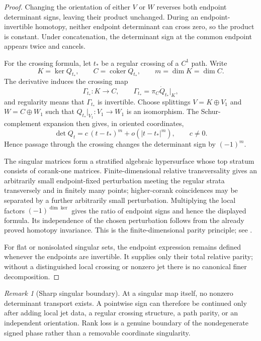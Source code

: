 \documentclass[11pt]{article}
\theoremstyle{definition}
\theoremstyle{remark}
\newtheorem{remark}[theorem]{Remark}
\begin{document}
\begin{proof}
Changing the orientation of either \(V\) or \(W\) reverses both endpoint
determinant signs, leaving their product unchanged.  During an
endpoint-invertible homotopy, neither endpoint determinant can cross zero, so
the product is constant.  Under concatenation, the determinant sign at the
common endpoint appears twice and cancels.

For the crossing formula, let \(t_*\) be a regular crossing of a \(C^1\)
path.  Write
\[
 K=\ker Q_{t_*},\qquad C=\operatorname{coker}Q_{t_*},
 \qquad m=\dim K=\dim C.
\]
The derivative induces the crossing map
\[
 \Gamma_{t_*}:K\longrightarrow C,\qquad
 \Gamma_{t_*}=\pi_C\dot Q_{t_*}|_K,
\]
and regularity means that \(\Gamma_{t_*}\) is invertible.  Choose splittings
\(V=K\oplus V_1\) and \(W=C\oplus W_1\) such that
\(Q_{t_*}|_{V_1}:V_1\to W_1\) is an isomorphism.  The Schur-complement
expansion then gives, in oriented coordinates,
\[
 \det Q_t
 =
 c\,(t-t_*)^m+o(|t-t_*|^m),
 \qquad c\ne0.
\]
Hence passage through the crossing changes the determinant sign by
\((-1)^m\).

The singular matrices form a stratified algebraic hypersurface whose
top stratum consists of corank-one matrices.  Finite-dimensional relative
transversality gives an arbitrarily small endpoint-fixed perturbation meeting
the regular strata transversely and in finitely many points; higher-corank
coincidences may be separated by a further arbitrarily small perturbation.
Multiplying the local factors \((-1)^{\dim\ker}\) gives the ratio of endpoint
signs and hence the displayed formula.  Its independence of the chosen
perturbation follows from the already proved homotopy invariance.  This is the
finite-dimensional parity principle; see
\cite{FitzpatrickPejsachowicz1991,DollSchulzBaldesWaterstraat2019}.

For flat or nonisolated singular sets, the endpoint expression remains
defined whenever the endpoints are invertible.  It supplies only their total
relative parity; without a distinguished local crossing or nonzero jet there
is no canonical finer decomposition.
\end{proof}

\begin{remark}[Sharp singular boundary]
At a singular map itself, no nonzero determinant transport exists.  A
pointwise sign can therefore be continued only after adding local jet data,
a regular crossing structure, a path parity, or an independent orientation.
Rank loss is a genuine boundary of the nondegenerate signed phase rather than
a removable coordinate singularity.
\end{remark}
\end{document}
